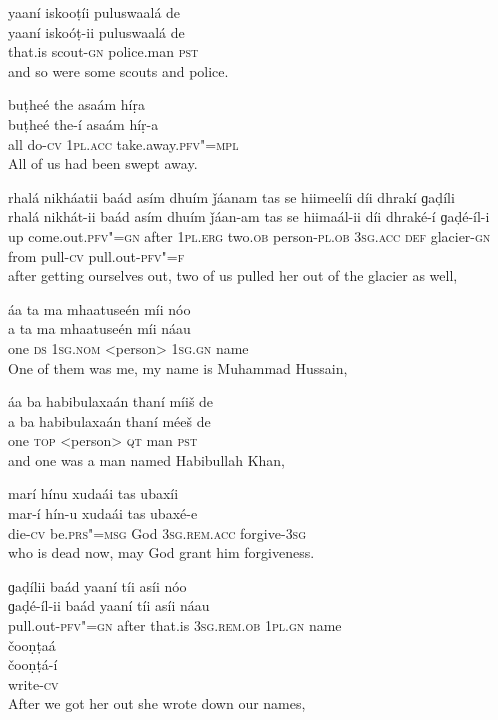 \begin{exe}
\ex
\label{ex:19}
\glll yaaní	iskooṭíi	puluswaalá	de \\
yaaní	iskoóṭ-ii	puluswaalá	de \\
that.is	scout-\textsc{gn}	police.man \textsc{pst} \\
\glt and so were some scouts and police.

\ex
\label{ex:20}
\glll buṭheé	the	asaám	híṛa \\
buṭheé	the-í	asaám	híṛ-a \\
all	do-\textsc{cv}	\textsc{1pl.acc}	take.away.\textsc{pfv"=mpl} \\
\glt All of us had been swept away.

\ex
\label{ex:21}
\glll rhalá	nikháatii	baád	asím	dhuím	ǰáanam  tas	se	hiimeelíi	díi	dhrakí	ɡaḍíli\\
rhalá	nikhát-ii	baád	asím	dhuím	ǰáan-am tas	se	hiimaál-ii	díi	dhraké-í	ɡaḍé-íl-i\\
up	come.out.\textsc{pfv"=gn}	after	\textsc{1pl.erg}	two.\textsc{ob}	person-\textsc{pl.ob} \textsc{3sg.acc} \textsc{def}	glacier-\textsc{gn}	from	pull-\textsc{cv}	pull.out-\textsc{pfv"=f}\\
\glt after getting ourselves out, two of us pulled her out of the glacier as well,

\ex
\label{ex:22}
\glll áa	ta	ma	mhaatuseén	míi	nóo \\
a	ta	ma	mhaatuseén	míi	náau \\
one	\textsc{ds} \textsc{1sg.nom}	<person> \textsc{1sg.gn}	name \\
\glt One of them was me, my name is Muhammad Hussain,

\ex
\label{ex:23}
\glll áa	ba	habibulaxaán	thaní	míiš	de \\
a	ba	habibulaxaán	thaní	méeš	de \\
one \textsc{top}	<person>	\textsc{qt}	man	\textsc{pst} \\
\glt and one was a man named Habibullah Khan,

\ex
\label{ex:24}
\glll marí	hínu	xudaái	tas	ubaxíi \\
mar-í	hín-u	xudaái	tas	ubaxé-e \\
die-\textsc{cv}	be.\textsc{prs"=msg}	God	\textsc{3sg.rem.acc}	forgive-\textsc{3sg} \\
\glt who is dead now, may God grant him forgiveness.

\ex
\label{ex:25}
\glll ɡaḍílii	baád	yaaní	tíi	asíi	nóo \\
ɡaḍé-íl-ii	baád	yaaní	tíi	asíi	náau \\
pull.out-\textsc{pfv"=gn}	after	that.is	\textsc{3sg.rem.ob}	\textsc{1pl.gn}	name \\
\glll čooṇṭaá \\
čooṇṭá-í \\
write-\textsc{cv} \\
\glt After we got her out she wrote down our names,


\end{exe}
